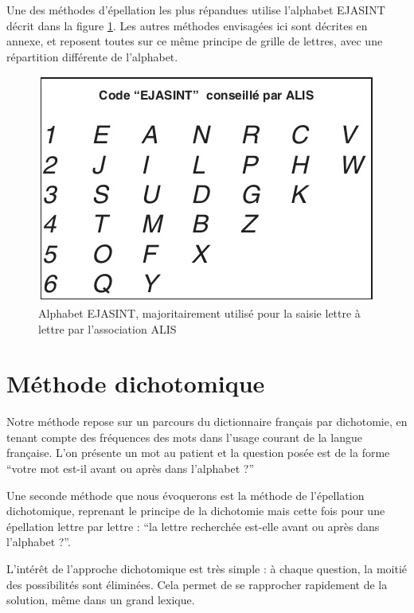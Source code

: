 \documentclass[twoside,twocolumn]{article}
\begin{document}
Une des méthodes d'épellation les plus répandues utilise l'alphabet EJASINT \cite{sans-parole} décrit dans la figure \ref{ejasint}. Les autres méthodes envisagées ici sont décrites en annexe, et reposent toutes sur ce même principe de grille de lettres, avec une répartition différente de l'alphabet.
\begin{center}
\begin{figure}
  \includegraphics[scale=0.45]{ejasint.jpg}
  \caption{Alphabet EJASINT, majoritairement utilisé pour la saisie lettre à lettre par l'association ALIS}
  \label{ejasint}
\end{figure}
\end{center}


\section{Méthode dichotomique}

Notre méthode repose sur un parcours du dictionnaire français par dichotomie, en tenant compte des fréquences des mots dans l'usage courant de la langue française. L'on présente un mot au patient et la question posée est de la forme ``votre mot est-il avant ou après dans l'alphabet ?''

Une seconde méthode que nous évoquerons est la méthode de l'épellation dichotomique, reprenant le principe de la dichotomie mais cette fois pour une épellation lettre par lettre : ``la lettre recherchée est-elle avant ou après dans l'alphabet ?''.

L'intérêt de l'approche dichotomique est très simple : à chaque question, la moitié des possibilités sont éliminées. Cela permet de se rapprocher rapidement de la solution, même dans un grand lexique.
\end{document}
